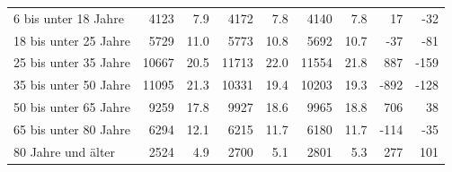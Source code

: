 \documentclass[
  a4paper,
  twoside]{article}
\begin{document}
\begin{table}[!h]
{\begin{threeparttable}
\begin{tabular}[t]{>{}l>{}r>{}r>{}r>{}r>{}r>{}r>{}r>{}r}
\hspace{1em}\hspace{1em}\textcolor{DoGray}{6 bis unter 18 Jahre} & \textcolor{DoGray}{4123} & \textcolor{DoGray}{7.9} & \textcolor{DoGray}{4172} & \textcolor{DoGray}{7.8} & \textcolor{DoGray}{4140} & \textcolor{DoGray}{7.8} & \textcolor{DoGray}{17} & \textcolor{DoGray}{-32}\\
\hspace{1em}\hspace{1em}\textcolor{DoGray}{18 bis unter 25 Jahre} & \textcolor{DoGray}{5729} & \textcolor{DoGray}{11.0} & \textcolor{DoGray}{5773} & \textcolor{DoGray}{10.8} & \textcolor{DoGray}{5692} & \textcolor{DoGray}{10.7} & \textcolor{DoGray}{-37} & \textcolor{DoGray}{-81}\\
\hspace{1em}\hspace{1em}\textcolor{DoGray}{25 bis unter 35 Jahre} & \textcolor{DoGray}{10667} & \textcolor{DoGray}{20.5} & \textcolor{DoGray}{11713} & \textcolor{DoGray}{22.0} & \textcolor{DoGray}{11554} & \textcolor{DoGray}{21.8} & \textcolor{DoGray}{887} & \textcolor{DoGray}{-159}\\
\hspace{1em}\hspace{1em}\textcolor{DoGray}{35 bis unter 50 Jahre} & \textcolor{DoGray}{11095} & \textcolor{DoGray}{21.3} & \textcolor{DoGray}{10331} & \textcolor{DoGray}{19.4} & \textcolor{DoGray}{10203} & \textcolor{DoGray}{19.3} & \textcolor{DoGray}{-892} & \textcolor{DoGray}{-128}\\
\hspace{1em}\hspace{1em}\textcolor{DoGray}{50 bis unter 65 Jahre} & \textcolor{DoGray}{9259} & \textcolor{DoGray}{17.8} & \textcolor{DoGray}{9927} & \textcolor{DoGray}{18.6} & \textcolor{DoGray}{9965} & \textcolor{DoGray}{18.8} & \textcolor{DoGray}{706} & \textcolor{DoGray}{38}\\
\hspace{1em}\hspace{1em}\textcolor{DoGray}{65 bis unter 80 Jahre} & \textcolor{DoGray}{6294} & \textcolor{DoGray}{12.1} & \textcolor{DoGray}{6215} & \textcolor{DoGray}{11.7} & \textcolor{DoGray}{6180} & \textcolor{DoGray}{11.7} & \textcolor{DoGray}{-114} & \textcolor{DoGray}{-35}\\
\hspace{1em}\hspace{1em}\textcolor{DoGray}{80 Jahre und älter} & \textcolor{DoGray}{2524} & \textcolor{DoGray}{4.9} & \textcolor{DoGray}{2700} & \textcolor{DoGray}{5.1} & \textcolor{DoGray}{2801} & \textcolor{DoGray}{5.3} & \textcolor{DoGray}{277} & \textcolor{DoGray}{101}\\

\end{tabular}
\end{threeparttable}}
\end{table}
\end{document}

